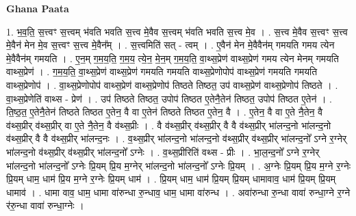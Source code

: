 \documentclass[17pt]{extarticle}
\begin{document}
\textbf{Ghana Paata } \newline

1. भ॒व॒ति॒ स॒त्त्वꣳ स॒त्त्वम् भ॑वति भवति स॒त्त्व मे॒वैव स॒त्त्वम् भ॑वति भवति स॒त्त्व मे॒व । . स॒त्त्व मे॒वैव स॒त्त्वꣳ स॒त्त्व मे॒वैन॑ मेन मे॒व स॒त्त्वꣳ स॒त्त्व मे॒वैन᳚म् । . स॒त्त्वमिति॑ सत् - त्वम् । . ए॒वैन॑ मेन मे॒वैवैन॑म् गमयति गमय त्येन मे॒वैवैन॑म् गमयति । . ए॒न॒म् ग॒म॒य॒ति॒ ग॒म॒य॒ त्ये॒न॒ मे॒न॒म् ग॒म॒य॒ति॒ वा॒थ्स॒प्रेण॑ वाथ्स॒प्रेण॑ गमय त्येन मेनम् गमयति वाथ्स॒प्रेण॑ । . ग॒म॒य॒ति॒ वा॒थ्स॒प्रेण॑ वाथ्स॒प्रेण॑ गमयति गमयति वाथ्स॒प्रेणोपोप॑ वाथ्स॒प्रेण॑ गमयति गमयति वाथ्स॒प्रेणोप॑ । . वा॒थ्स॒प्रेणोपोप॑ वाथ्स॒प्रेण॑ वाथ्स॒प्रेणोप॑ तिष्ठते तिष्ठत॒ उप॑ वाथ्स॒प्रेण॑ वाथ्स॒प्रेणोप॑ तिष्ठते । . वा॒थ्स॒प्रेणेति॑ वाथ्स - प्रेण॑ । . उप॑ तिष्ठते तिष्ठत॒ उपोप॑ तिष्ठत ए॒तेनै॒तेन॑ तिष्ठत॒ उपोप॑ तिष्ठत ए॒तेन॑ । . ति॒ष्ठ॒त॒ ए॒तेनै॒तेन॑ तिष्ठते तिष्ठत ए॒तेन॒ वै वा ए॒तेन॑ तिष्ठते तिष्ठत ए॒तेन॒ वै । . ए॒तेन॒ वै वा ए॒ते नै॒तेन॒ वै व॑थ्स॒प्रीर् व॑थ्स॒प्रीर् वा ए॒ते नै॒तेन॒ वै व॑थ्स॒प्रीः । . वै व॑थ्स॒प्रीर् व॑थ्स॒प्रीर् वै वै व॑थ्स॒प्रीर् भा॑लन्द॒नो भा॑लन्द॒नो व॑थ्स॒प्रीर् वै वै व॑थ्स॒प्रीर् भा॑लन्द॒नः । . व॒थ्स॒प्रीर् भा॑लन्द॒नो भा॑लन्द॒नो व॑थ्स॒प्रीर् व॑थ्स॒प्रीर् भा॑लन्द॒नो᳚ ऽग्ने र॒ग्नेर् भा॑लन्द॒नो व॑थ्स॒प्रीर् व॑थ्स॒प्रीर् भा॑लन्द॒नो᳚ ऽग्नेः । . व॒थ्स॒प्रीरिति॑ वथ्स - प्रीः । . भा॒ल॒न्द॒नो᳚ ऽग्ने र॒ग्नेर् भा॑लन्द॒नो भा॑लन्द॒नो᳚ ऽग्नेः प्रि॒यम् प्रि॒य म॒ग्नेर् भा॑लन्द॒नो भा॑लन्द॒नो᳚ ऽग्नेः प्रि॒यम् । . अ॒ग्नेः प्रि॒यम् प्रि॒य म॒ग्ने र॒ग्नेः प्रि॒यम् धाम॒ धाम॑ प्रि॒य म॒ग्ने र॒ग्नेः प्रि॒यम् धाम॑ । . प्रि॒यम् धाम॒ धाम॑ प्रि॒यम् प्रि॒यम् धामावाव॒ धाम॑ प्रि॒यम् प्रि॒यम् धामाव॑ । . धामा वाव॒ धाम॒ धामा वा॑रुन्धा रु॒न्धाव॒ धाम॒ धामा वा॑रुन्ध । . अवा॑रुन्धा रु॒न्धा वावा॑ रुन्धा॒ग्ने र॒ग्ने र॑रु॒न्धा वावा॑ रुन्धा॒ग्नेः । \newline
\end{document}
